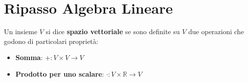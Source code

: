 \chapter{Ripasso Algebra Lineare}
\begin{definizione} 
    Un insieme $V$ si dice \textbf{spazio vettoriale} se sono definite su $V$ due
    operazioni che godono di particolari proprietà:
    \begin{itemize}
        \item \textbf{Somma}: $+: V \times V \rightarrow V$
        \item \textbf{Prodotto per uno scalare}: $\cdot : V \times \mathbb{R} \rightarrow V$
    \end{itemize}
\end{definizione}

